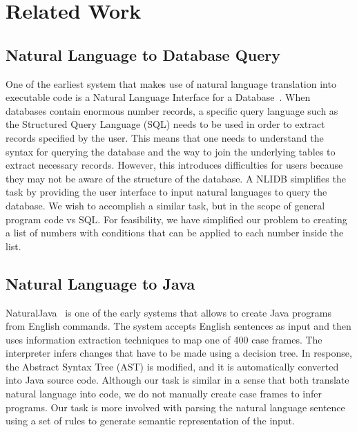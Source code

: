 \documentclass[11pt,letterpaper]{article}
\begin{document}
\section{Related Work}

\subsection{Natural Language to Database Query}

One of the earliest system that makes use of natural language translation into executable code is a Natural Language Interface for a Database~\cite{Androutsopoulos1995NaturalLI}. 
When databases contain enormous number records, a specific query language such as the Structured Query Language (SQL) needs to be used in order to extract records specified by the user. 
This means that one needs to understand the syntax for querying the database and the way to join the underlying tables to extract necessary records. 
However, this introduces difficulties for users because they may not be aware of the structure of the database. 
A NLIDB simplifies the task by providing the user interface to input natural languages to query the database.
We wish to accomplish a similar task, but in the scope of general program code vs SQL.
For feasibility, we have simplified our problem to creating a list of numbers with conditions that can be applied to each number inside the list.   

\subsection{Natural Language to Java}
NaturalJava~\cite{Price2000NaturalJavaAN} is one of the early systems that 
allows to create Java programs from English commands. 
The system accepts English sentences as input and then uses information extraction techniques to map one of 400 case frames. 
The interpreter infers changes that have to be made using a decision tree. In response, the Abstract Syntax Tree (AST) is modified, and it is automatically converted into Java source code. 
Although our task is similar in a sense that both translate natural language into code, we do not manually create case frames to infer programs. 
Our task is more involved with parsing the natural language sentence using a set of rules to generate semantic representation of the input.
\end{document}
